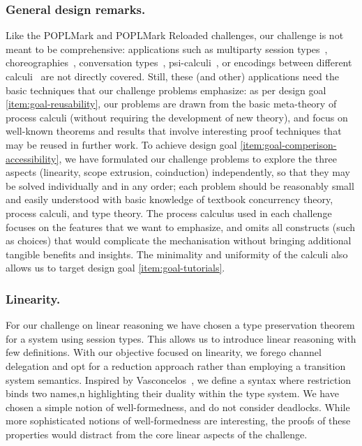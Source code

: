 \documentclass[runningheads]{llncs}
\begin{document}
\subsubsection{General design remarks.}
Like the POPLMark and POPLMark Reloaded challenges, our challenge is not meant to be comprehensive:
applications such as multiparty session types~\cite{10.1145/2827695,10.1145/3290343}, choreographies~\cite{DBLP:journals/jar/CruzFilipeMP23}, conversation types~\cite{DBLP:journals/tcs/CairesV10}, psi-calculi~\cite{lmcs:696}, or encodings between different calculi~\cite{DBLP:journals/iandc/Gorla10,DBLP:conf/forte/CairesP16,DBLP:journals/iandc/DardhaGS17,DBLP:conf/ecoop/ScalasDHY17,DBLP:journals/iandc/KouzapasPY19,10.1145/3479394.3479407} are not directly covered.
Still, these (and other) applications need the basic techniques that our challenge problems emphasize: as per design goal \ref{item:goal-reusability}, our problems are drawn from the basic meta-theory of process calculi (without requiring the development of new theory), and focus on well-known theorems and results that involve interesting proof techniques that may be reused in further work.
To achieve design goal \ref{item:goal-comperison-accessibility},
we have formulated our challenge problems to explore the three aspects (linearity, scope extrusion, coinduction) independently, so that they may be solved individually and in any order;
each problem should be reasonably small and easily understood with basic knowledge of textbook concurrency theory, process calculi, and type theory.  The process calculus used in each challenge
focuses on the features that we want to emphasize, and omits all constructs
(such as choices) that would complicate the mechanisation without bringing additional tangible
benefits and insights. 
The minimality and uniformity of the calculi also allows us to target design
goal \ref{item:goal-tutorials}.

\subsubsection{Linearity.}
For our challenge on linear reasoning we have chosen a type preservation theorem
for a system using session types.
This allows us to introduce linear reasoning with few definitions.
With our objective focused on linearity, we forego channel delegation
and opt for a reduction approach rather than employing a transition
system semantics.  Inspired by Vasconcelos~\cite{Vasconcelos2012}, we
define a syntax where restriction binds two names,n highlighting
their duality within the type system.  We have chosen a simple notion
of well-formedness, and do not  consider
deadlocks. While more sophisticated notions of well-formedness are
interesting, the proofs of these properties would distract from the
core linear aspects of the challenge.
\end{document}
